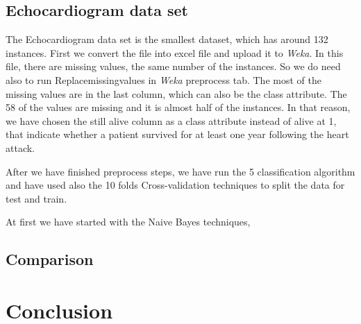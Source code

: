 \documentclass[a4paper]{article}
\begin{document}
\subsection{Echocardiogram data set}

The Echocardiogram data set is the smallest dataset, which has around 132 instances. First we convert the file into excel file and upload it to \emph{Weka}. In this file, there are missing values, the same number of the instances. So we do need also to run Replacemissingvalues in \emph{Weka} preprocess tab. The most of the missing values are in the last column, which can also be the class attribute. The 58 of the values are missing and it is almost half of the instances. In that reason, we have chosen the still alive column as a class attribute instead of alive at 1, that indicate whether a patient survived for at least one year following the heart attack. 

After we have finished preprocess steps, we have run the 5 classification algorithm and have used also the 10 folds Cross-validation techniques to split the data for test and train. 

At first we have started with the Naive Bayes techniques,







\subsection{Comparison}

\section{Conclusion}
\end{document}
